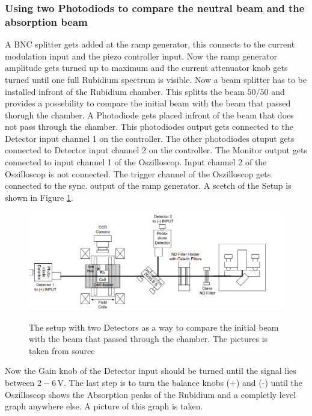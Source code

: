 \subsubsection{Using two Photodiods to compare the neutral beam and the absorption beam}
A BNC splitter gets added at the ramp generator, this connects to the current modulation input and the piezo controller input.
Now the ramp generator amplitude gets turned up to maximum and the current attenuator knob gets turned until one full Rubidium spectrum is visible.
Now a beam splitter has to be installed infront of the Rubidium chamber.
This splitts the beam $50/50$ and provides a possebility to compare the initial beam with the beam that passed thorugh the chamber.
A Photodiode gets placed infront of the beam that does not pass through the chamber.
This photodiodes output gets connected to the Detector input channel 1 on the controller.
The other photodiodes otuput gets connected to Detector input channel 2 on the controller.
The Monitor output gets connected to input channel 1 of the Oszilloscop.
Input channel 2 of the Oszilloscop is not connected.
The trigger channel of the Oszilloscop gets connected to the sync. output of the ramp generator.
A scetch of the Setup is shown in Figure \ref{fig:setup}.

\begin{figure}
    \centering
    \caption{The setup with two Detectors as a way to compare the initial beam with the beam that passed through the chamber. The pictures is taken from source \cite[16]{anleitung_exp}}
    \includegraphics[width=\textwidth]{content/data/setup}
    \label{fig:setup}
\end{figure}

Now the Gain knob of the Detector input should be turned until the signal lies between $2-6 \,\si{\volt}$.
The last step is to turn the balance knobs (+) and (-) until the Oszilloscop shows the Absorption peaks of the Rubidium and a completly level graph anywhere else.
A picture of this graph is taken.

